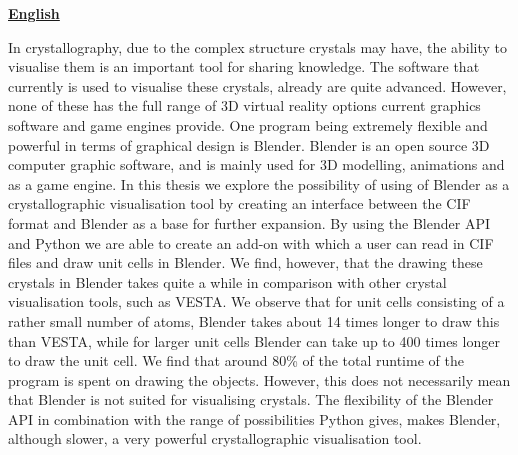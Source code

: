 \newpage
\textbf{\underline{English}}
\par
In crystallography, due to the complex structure crystals may have, the ability to visualise them is an important tool for sharing knowledge. The software that currently is used to visualise these crystals, already are quite advanced. However, none of these has the full range of 3D virtual reality options current graphics software and game engines provide. One program being extremely flexible and powerful in terms of graphical design is Blender. Blender is an open source 3D computer graphic software, and is mainly used for 3D modelling, animations and as a game engine. In this thesis we explore the possibility of using of Blender as a crystallographic visualisation tool by creating an interface between the CIF format and Blender as a base for further expansion. By using the Blender API and Python we are able to create an add-on with which a user can read in CIF files and draw unit cells in Blender. We find, however, that the drawing these crystals in Blender takes quite a while in comparison with other crystal visualisation tools, such as VESTA. We observe that for unit cells consisting of a rather small number of atoms, Blender takes about 14 times longer to draw this than VESTA, while for larger unit cells Blender can take up to 400 times longer to draw the unit cell. We find that around 80\% of the total runtime of the program is spent on drawing the objects. However, this does not necessarily mean that Blender is not suited for visualising crystals. The flexibility of the Blender API in combination with the range of possibilities Python gives, makes Blender, although slower, a very powerful crystallographic visualisation tool.                